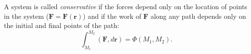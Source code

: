 A system is called \textit{conservative} if the forces depend only on the location of points in the system ($\mathbf{F} = \mathbf{F}(\mathbf{r})$) and if the work of $\mathbf{F}$ along any path depends only on the initial and final points of the path:
$$\int_{M_1}^{M_2} (\mathbf{F}, d\mathbf{r}) = \Phi(M_1, M_2).$$
